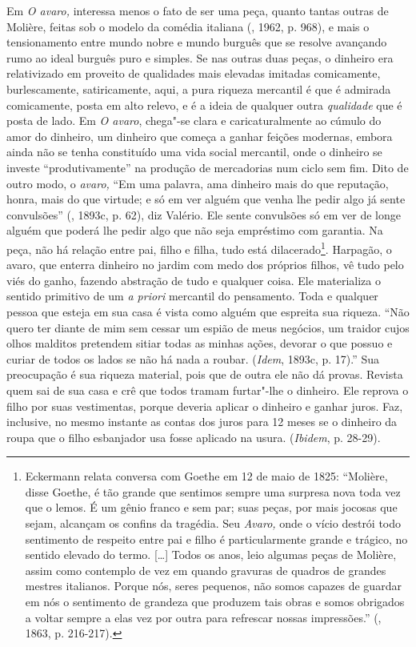 Em \emph{O avaro,} interessa menos o fato de ser uma peça, quanto tantas
outras de Molière, feitas sob o modelo da comédia italiana (, 1962,
p. 968), e mais o tensionamento entre mundo nobre e mundo burguês que se
resolve avançando rumo ao ideal burguês puro e simples. Se nas outras
duas peças, o dinheiro era relativizado em proveito de qualidades mais
elevadas imitadas comicamente, burlescamente, satiricamente, aqui, a
pura riqueza mercantil é que é admirada comicamente, posta em alto
relevo, e é a ideia de qualquer outra \emph{qualidade} que é posta de
lado. Em \emph{O avaro}, chega"-se clara e caricaturalmente ao cúmulo do
amor do dinheiro, um dinheiro que começa a ganhar feições modernas,
embora ainda não se tenha constituído uma vida social mercantil, onde o
dinheiro se investe ``produtivamente'' na produção de mercadorias num
ciclo sem fim. Dito de outro modo, o \emph{avaro,} ``Em uma palavra, ama
dinheiro mais do que reputação, honra, mais do que virtude; e só em ver
alguém que venha lhe pedir algo já sente convulsões'' (, 1893c,
p. 62), diz Valério. Ele sente convulsões só em ver de longe alguém que
poderá lhe pedir algo que não seja empréstimo com garantia. Na peça, não
há relação entre pai, filho e filha, tudo está dilacerado\footnote{Eckermann
  relata conversa com Goethe em 12 de maio de 1825: ``Molière, disse
  Goethe, é tão grande que sentimos sempre uma surpresa nova toda vez
  que o lemos. É um gênio franco e sem par; suas peças, por mais jocosas
  que sejam, alcançam os confins da tragédia. Seu \emph{Avaro,} onde o
  vício destrói todo sentimento de respeito entre pai e filho é
  particularmente grande e trágico, no sentido elevado do termo.
  [\ldots{}] Todos os anos, leio algumas peças de Molière, assim como
  contemplo de vez em quando gravuras de quadros de grandes mestres
  italianos. Porque nós, seres pequenos, não somos capazes de guardar em
  nós o sentimento de grandeza que produzem tais obras e somos obrigados
  a voltar sempre a elas vez por outra para refrescar nossas
  impressões.'' (, 1863, p. 216-217).}. Harpagão, o avaro, que
enterra dinheiro no jardim com medo dos próprios filhos, vê tudo pelo
viés do ganho, fazendo abstração de tudo e qualquer coisa. Ele
materializa o sentido primitivo de um \emph{a priori} mercantil do
pensamento. Toda e qualquer pessoa que esteja em sua casa é vista como
alguém que espreita sua riqueza. ``Não quero ter diante de mim sem
cessar um espião de meus negócios, um traidor cujos olhos malditos
pretendem sitiar todas as minhas ações, devorar o que possuo e curiar de
todos os lados se não há nada a roubar. (\emph{Idem}, 1893c, p. 17).''
Sua preocupação é sua riqueza material, pois que de outra ele não dá
provas. Revista quem sai de sua casa e crê que todos tramam furtar"-lhe o
dinheiro. Ele reprova o filho por suas vestimentas, porque deveria
aplicar o dinheiro e ganhar juros. Faz, inclusive, no mesmo instante as
contas dos juros para 12 meses se o dinheiro da roupa que o filho
esbanjador usa fosse aplicado na usura. (\emph{Ibidem}, p. 28-29).

